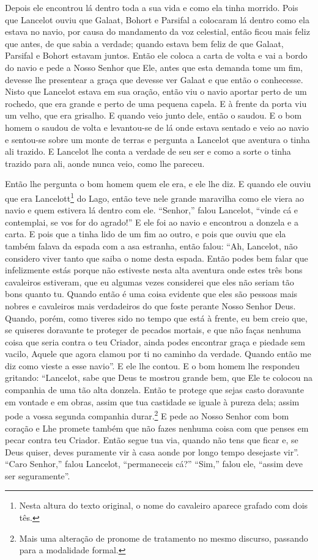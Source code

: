Depois ele encontrou lá dentro toda a sua vida e como ela tinha morrido. Pois
que Lancelot ouviu que Galaat, Bohort e Parsifal a colocaram lá dentro como
ela estava no navio, por causa do mandamento da voz celestial, então ficou mais
feliz que antes, de que sabia a verdade; quando estava bem feliz de que Galaat,
Parsifal e Bohort estavam juntos. Então ele coloca a carta de volta e vai a
bordo do navio e pede a Nosso Senhor que Ele, antes que esta demanda tome um
fim, devesse lhe presentear a graça que devesse ver Galaat e que então o
conhecesse. Nisto que Lancelot estava em sua oração, então viu o navio aportar
perto de um rochedo, que era grande e perto de uma pequena capela. E à frente
da porta viu um velho, que era grisalho. E quando veio junto dele, então o
saudou. E o bom homem o saudou de volta e levantou-se de lá onde estava sentado
e veio ao navio e sentou-se sobre um monte de terras e pergunta a Lancelot que
aventura o tinha ali trazido. E Lancelot lhe conta a verdade de seu ser e como
a sorte o tinha trazido para ali, aonde nunca veio, como lhe pareceu.

Então lhe pergunta o bom homem quem ele era, e ele lhe diz. E quando ele ouviu
que era Lancelott\footnote{ Nesta altura do texto original, o nome do
cavaleiro aparece grafado com dois tês.}  do Lago, então teve nele
grande maravilha como ele viera ao navio e quem estivera lá dentro com ele.
“Senhor,” falou Lancelot, “vinde cá e contemplai, se vos for do agrado!” E
ele foi ao navio e encontrou a donzela e a carta. E pois que a tinha lido de um
fim ao outro, e pois que ouviu que ela também falava da espada com a asa
estranha, então falou: “Ah, Lancelot, não considero viver tanto que saiba o
nome desta espada. Então podes bem falar que infelizmente estás porque não estiveste
nesta alta aventura onde estes três bons cavaleiros estiveram, que eu algumas
vezes considerei que eles não seriam tão bons quanto tu. Quando então é uma
coisa evidente que eles são pessoas mais nobres e cavaleiros mais verdadeiros
do que foste perante Nosso Senhor Deus. Quando, porém, como tiveres sido no
tempo que está à frente, eu bem creio que, se quiseres doravante te proteger de
pecados mortais, e que não faças nenhuma coisa que seria contra o teu Criador,
ainda podes encontrar graça e piedade sem vacilo, Aquele que agora clamou por
ti no caminho da verdade. Quando então me diz como vieste a esse
navio”. E ele lhe contou. E o bom homem lhe respondeu gritando: “Lancelot,
sabe que Deus te mostrou grande bem, que Ele te colocou na companhia de uma tão
alta donzela. Então te protege que sejas casto doravante em vontade e em obras,
assim que tua castidade se iguale à pureza dela; assim pode a vossa segunda
companhia durar.\footnote{ Mais uma alteração de pronome de tratamento no mesmo
discurso, passando para a modalidade formal.}  E pede ao Nosso
Senhor com bom coração e Lhe promete também que não fazes nenhuma coisa com que
penses em pecar contra teu Criador. Então segue tua via, quando não tens que
ficar e, se Deus quiser, deves puramente vir à casa aonde por longo tempo
desejaste vir”. “Caro Senhor,” falou Lancelot, “permaneceis cá?” “Sim,” falou
ele, “assim deve ser seguramente”.


